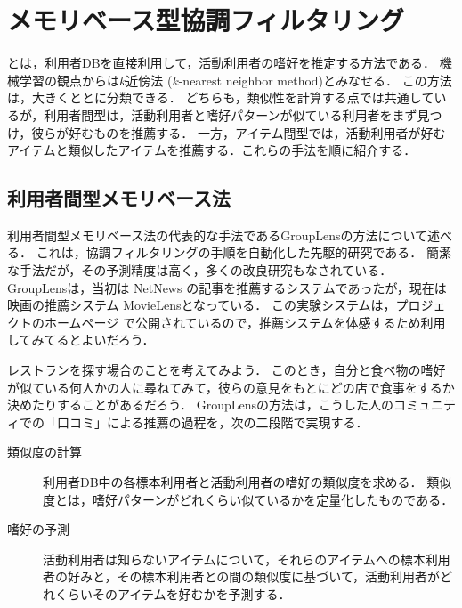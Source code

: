 \chapter{メモリベース型協調フィルタリング}
\label{chap:memorybase}

とは，利用者DBを直接利用して，活動利用者の嗜好を推定する方法である．
機械学習の観点からは$k$近傍法 ($k$-nearest neighbor method)とみなせる．
この方法は，大きくととに分類できる．
どちらも，類似性を計算する点では共通しているが，利用者間型は，活動利用者と嗜好パターンが似ている利用者をまず見つけ，彼らが好むものを推薦する．
一方，アイテム間型では，活動利用者が好むアイテムと類似したアイテムを推薦する．これらの手法を順に紹介する．

\section{利用者間型メモリベース法}
\label{sec:user-user}

利用者間型メモリベース法の代表的な手法であるGroupLensの方法\cite{cscw:94:01}について述べる．
これは，協調フィルタリングの手順を自動化した先駆的研究である．
簡潔な手法だが，その予測精度は高く，多くの改良研究もなされている．
GroupLensは，当初は NetNews の記事を推薦するシステムであったが，現在は映画の推薦システム MovieLensとなっている．
この実験システムは，プロジェクトのホームページ\cite{url:008} で公開されているので，推薦システムを体感するため利用してみてるとよいだろう．

レストランを探す場合のことを考えてみよう．
このとき，自分と食べ物の嗜好が似ている何人かの人に尋ねてみて，彼らの意見をもとにどの店で食事をするか決めたりすることがあるだろう．
GroupLensの方法は，こうした人のコミュニティでの「口コミ」による推薦の過程を，次の二段階で実現する．
\begin{description}
 \item[類似度の計算]
 利用者DB中の各標本利用者と活動利用者の嗜好の類似度を求める．
 類似度とは，嗜好パターンがどれくらい似ているかを定量化したものである．
 \item[嗜好の予測]
 活動利用者は知らないアイテムについて，それらのアイテムへの標本利用者の好みと，その標本利用者との間の類似度に基づいて，活動利用者がどれくらいそのアイテムを好むかを予測する．
\end{description}

